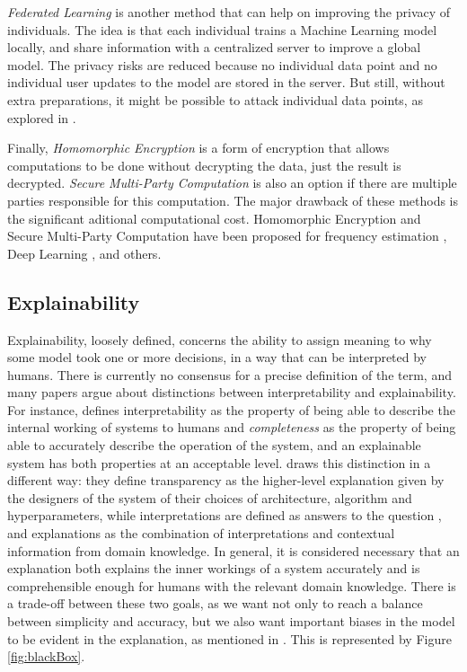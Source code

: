 \emph{Federated Learning} is another method that can help on improving the privacy of individuals. The idea is that each individual trains a Machine Learning model locally, and share information with a centralized server to improve a global model. The privacy risks are reduced because no individual data point and no individual user updates to the model are stored in the server. But still, without extra preparations, it might be possible to attack individual data points, as explored in \cite{wang2019beyond}.

Finally, \emph{Homomorphic Encryption} is a form of encryption that allows computations to be done without decrypting the data, just the result is decrypted. \emph{Secure Multi-Party Computation} is also an option if there are multiple parties responsible for this computation. The major drawback of these methods is the significant aditional computational cost. Homomorphic Encryption and Secure Multi-Party Computation have been proposed for frequency estimation \cite{yang2005privacy}, Deep Learning \cite{hesamifard2017cryptodl}\cite{goswami2024privacy}, and others.

\subsection{Explainability}

Explainability, loosely defined, concerns the ability to assign meaning to why some model took one or more decisions, in a way that can be interpreted by humans. There is currently no consensus for a precise definition of the term, and many papers argue about distinctions between interpretability and explainability. For instance, \cite{gilpin2018explaining} defines interpretability as the property of being able to describe the internal working of systems to humans and \emph{completeness} as the property of being able to accurately describe the operation of the system, and an explainable system has both properties at an acceptable level. \cite{roscher2020explainable} draws this distinction in a different way: they define transparency as the higher-level explanation given by the designers of the system of their choices of architecture, algorithm and hyperparameters, while interpretations are defined as answers to the question , and explanations as the combination of interpretations and contextual information from domain knowledge. In general, it is considered necessary that an explanation both explains the inner workings of a system accurately and is comprehensible enough for humans with the relevant domain knowledge. There is a trade-off between these two goals, as we want not only to reach a balance between simplicity and accuracy, but we also want important biases in the model to be evident in the explanation, as mentioned in \cite{gilpin2018explaining}. This is represented by Figure \ref{fig:blackBox}.

